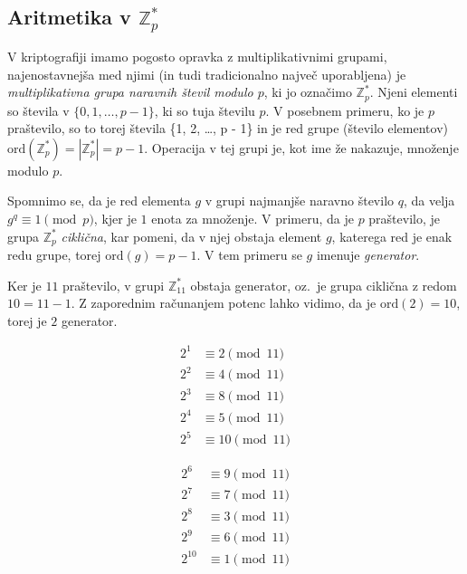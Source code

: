 \documentclass[isrm2, tisk]{fmfdelo}
\newcommand{\Z}{\mathbb Z}
\begin{document}
\subsection{Aritmetika v \texorpdfstring{$\Z_p^*$}{Zp∗}}
V kriptografiji imamo pogosto opravka z multiplikativnimi grupami, najenostavnejša med njimi (in 
tudi tradicionalno največ uporabljena) je \textit{multiplikativna grupa naravnih števil modulo $p$},
ki jo označimo $\Z_p^*$. Njeni elementi so števila v $\{0, 1, \dots, p - 1\}$, ki so tuja številu $p$.
V posebnem primeru, ko je $p$ praštevilo, so to torej števila \{1, 2, \dots, p - 1\} in je red grupe
(število elementov) $\text{ord}(\Z_p^*) = |\Z_p^*| = p - 1$. Operacija v tej grupi je, kot ime že
nakazuje, množenje modulo $p$.

Spomnimo se, da je red elementa $g$ v grupi najmanjše naravno število $q$, da velja $g^q \equiv 1 \pmod p$, 
kjer je $1$ enota za množenje. V primeru, da je $p$ praštevilo, je grupa $\Z_p^*$ \textit{ciklična},
kar pomeni, da v njej obstaja element $g$, katerega red je enak redu grupe, torej $\text{ord}(g) = p - 1$.
V tem primeru se $g$ imenuje \textit{generator}.

\begin{primer}[Grupa $\Z_{11}^*$]
\label{primer:Z11}
Ker je $11$ praštevilo, v grupi $\Z_{11}^*$ obstaja generator, oz.\ je grupa ciklična z redom $10 = 
11 - 1$. Z zaporednim računanjem potenc lahko vidimo, da je $\text{ord}(2) = 10$, torej je $2$ 
generator.

\begin{minipage}{0.45\textwidth}
    \begin{align*}
        2^1 &\equiv 2 \pmod{11} \\
        2^2 &\equiv 4 \pmod{11} \\
        2^3 &\equiv 8 \pmod{11} \\
        2^4 &\equiv 5 \pmod{11} \\
        2^5 &\equiv 10 \pmod{11} 
    \end{align*}
\end{minipage}
\begin{minipage}{0.45\textwidth}
    \begin{align*}
        2^6 &\equiv 9 \pmod{11} \\
        2^7 &\equiv 7 \pmod{11} \\
        2^8 &\equiv 3 \pmod{11} \\
        2^9 &\equiv 6 \pmod{11} \\
        2^{10} &\equiv 1 \pmod{11} 
    \end{align*}
\end{minipage}

\end{primer}
\end{document}
